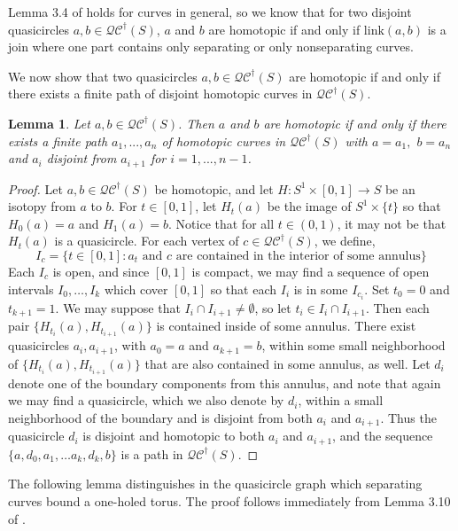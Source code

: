 \documentclass[12pt,a4paper]{amsart}
\theoremstyle{definition}
\theoremstyle{plain}
\newtheorem{lemma}[theorem]{Lemma}
\numberwithin{equation}{section}
\newcommand{\qcg}{\mathcal{QC}^{\dagger}}
\begin{document}
Lemma 3.4 of \cite{booth2024automorphisms} holds for curves in general, so we know that for two disjoint quasicircles $a,b \in \qcg(S)$, $a$ and $b$ are homotopic if and only if $\mathrm{link}(a,b)$ is a join where one part contains only separating or only nonseparating curves.

We now show that two quasicircles $a,b \in \qcg(S)$ are homotopic if and only if there exists a finite path of disjoint homotopic curves in $\qcg(S)$.

\begin{lemma}\label{Lem:QuasiCirclesHomotopic}
    Let $a, b \in \qcg(S)$. Then $a$ and $b$ are homotopic if and only if there
    exists a finite path $a_1, ..., a_n$ of homotopic curves in $\qcg(S)$ with $a = a_1,$ $b = a_n$ and $a_i$ disjoint from $a_{i+1}$ for $i = 1, ..., n-1$.
\end{lemma}

\begin{proof}
    Let $a, b \in \qcg(S)$ be homotopic, and let $H : S^1 \times [0,1] \to S$ be an isotopy from $a$ to $b$.
    For $t \in [0,1]$, let $H_t(a)$ be the image of $S^1 \times \{t\}$ so that $H_0(a) = a$ and $H_1(a) = b$.
    Notice that for all $t \in (0,1)$, it may not be that $H_t(a)$ is a quasicircle.
    For each vertex of $c \in \qcg(S)$, we define,
    \[
        I_c = \{t \in [0,1] : a_t \text{ and } c \text{ are contained in the interior of some annulus}\}
    \]
    Each $I_c$ is open, and since $[0,1]$ is compact, we may find a sequence of open intervals $I_0, \ldots, I_k$ which cover $[0,1]$ so that each $I_i$ is in some $I_{c_i}$.
    Set $t_0 = 0$ and  $t_{k+1} = 1$.  We may suppose that $I_i \cap I_{i+1} \neq \emptyset$,
    so let $t_i \in I_i \cap I_{i+1}$.
    Then each pair $\{H_{t_i}(a) , H_{t_{i+1}}(a)\}$ is contained inside of some annulus.
    There exist quasicircles $a_{i}, a_{i+1}$, with $a_0=a$ and $a_{k+1}=b$, within some small neighborhood of $\{H_{t_i}(a), H_{t_{i+1}}(a)\}$ that are also contained in some annulus, as well. Let $d_i$ denote one of the boundary components from this annulus, and note that again we may find a quasicircle, which we also denote by $d_i$, within a small neighborhood of the boundary and is disjoint from both $a_i$ and $a_{i+1}$.
    Thus the quasicircle $d_i$ is disjoint and homotopic to both $a_{i}$ and $a_{{i+1}}$, and the sequence $\{a, d_0,a_1, \ldots a_{k}, d_{k}, b\}$ is a path in $\qcg(S)$.
\end{proof}

The following lemma  distinguishes in the quasicircle graph which separating curves bound a one-holed torus.
The proof follows immediately from Lemma 3.10 of \cite{booth2024automorphisms}.
\end{document}
